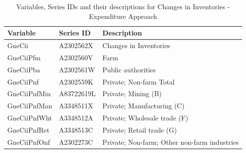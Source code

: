 \documentclass[graybox]{svmult}
\begin{document}
\begin{table}[h]
	\caption{Variables, Series IDs and their descriptions for Changes in Inventories - Expenditure Approach}
	\small
	\centering
		\begin{tabular*}{\columnwidth}[width = \textwidth]{lll}
			
			\toprule
			\textbf{Variable} & \textbf{Series ID} & \textbf{Description}\\
			\midrule
			
			GneCii & A2302562X & Changes in Inventories\\
			GneCiiPfm & A2302560V & Farm\\
			GneCiiPba & A2302561W & Public authorities\\
			GneCiiPnf & A2302559K & Private; Non-farm Total\\
			GneCiiPnfMin & A83722619L & Private; Mining (B)\\
			\addlinespace
			GneCiiPnfMan & A3348511X & Private; Manufacturing (C)\\
			GneCiiPnfWht & A3348512A & Private; Wholesale trade (F)\\
			GneCiiPnfRet & A3348513C & Private; Retail trade (G)\\
			GneCiiPnfOnf & A2302273C & Private; Non-farm; Other non-farm industries\\
			\bottomrule
		\end{tabular*}
		\label{Tab:Expenditure-hierarchy-2}
	
\end{table}
\end{document}
